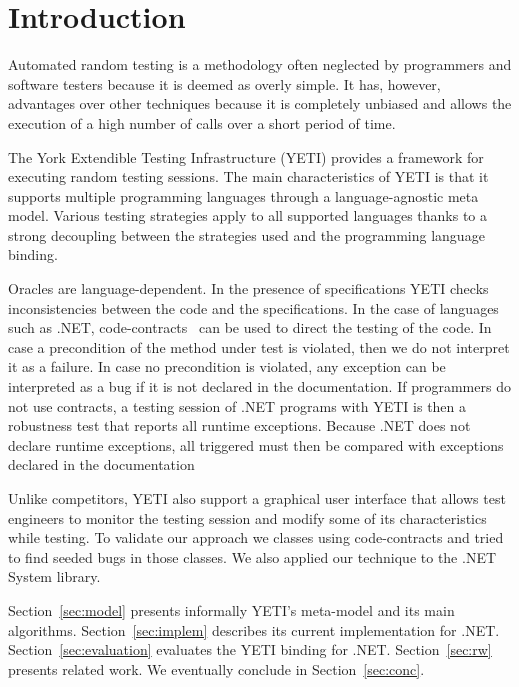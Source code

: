 \section{Introduction}\label{sec:intro}

Automated random testing is a methodology often neglected by 
programmers and software testers because it is deemed as overly
simple. It has, however, advantages over other techniques because 
it is completely unbiased and allows the execution of a high number 
of calls over a short period of time.


The York Extendible Testing Infrastructure (YETI) provides a framework 
for executing random testing sessions. The main characteristics of 
YETI is that it supports multiple programming languages through a 
language-agnostic meta model. Various testing strategies apply
to all supported languages thanks to a strong decoupling between the 
strategies used and the programming language binding. 

Oracles are language-dependent. In the presence of specifications YETI checks 
inconsistencies between the code and the specifications. In the case of 
languages such as .NET, code-contracts~\cite{} can be used to direct the testing 
of the code. In case a precondition of the method under test is violated, then we 
do not interpret it as a failure. In case no precondition is violated, any 
exception can be interpreted as a bug if it is not declared in the documentation. 
If programmers do not use contracts, a testing session of .NET programs with YETI 
is then a robustness test that reports all runtime exceptions. Because .NET does 
not declare runtime exceptions, all triggered must then be compared with exceptions 
declared in the documentation 
 

Unlike competitors, YETI also support a graphical user interface that 
allows test engineers to monitor the testing session and modify some 
of its characteristics while testing. To validate our approach we classes using 
code-contracts and tried to find seeded bugs in those classes. We also applied 
our technique to the .NET System library. 


Section~\ref{sec:model} presents informally YETI's meta-model and its main algorithms.
Section~\ref{sec:implem} describes its current implementation for .NET.
Section~\ref{sec:evaluation} evaluates the YETI binding for .NET.
Section~\ref{sec:rw} presents related work.
We eventually conclude in Section~\ref{sec:conc}.